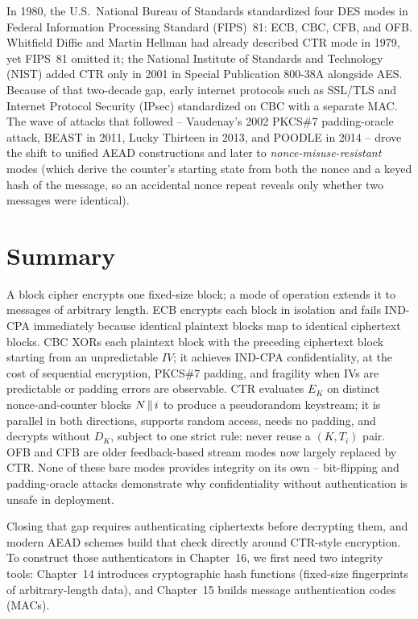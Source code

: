 \begin{historybox}
In 1980, the U.S.\ National Bureau of Standards standardized four DES modes in Federal Information Processing Standard (FIPS)~81: ECB, CBC, CFB, and OFB. Whitfield Diffie and Martin Hellman had already described CTR mode in 1979, yet FIPS~81 omitted it; the National Institute of Standards and Technology (NIST) added CTR only in 2001 in Special Publication 800-38A alongside AES. Because of that two-decade gap, early internet protocols such as SSL/TLS and Internet Protocol Security (IPsec) standardized on CBC with a separate MAC. The wave of attacks that followed -- Vaudenay's 2002 PKCS\#7 padding-oracle attack, BEAST in 2011, Lucky Thirteen in 2013, and POODLE in 2014 -- drove the shift to unified AEAD constructions and later to \emph{nonce-misuse-resistant} modes (which derive the counter's starting state from both the nonce and a keyed hash of the message, so an accidental nonce repeat reveals only whether two messages were identical).
\end{historybox}

\section{Summary}

A block cipher encrypts one fixed-size block; a mode of operation extends it to messages of arbitrary length. ECB encrypts each block in isolation and fails IND-CPA immediately because identical plaintext blocks map to identical ciphertext blocks. CBC XORs each plaintext block with the preceding ciphertext block starting from an unpredictable $\mathit{IV}$; it achieves IND-CPA confidentiality, at the cost of sequential encryption, PKCS\#7 padding, and fragility when IVs are predictable or padding errors are observable. CTR evaluates $E_K$ on distinct nonce-and-counter blocks $N \,\|\, i$ to produce a pseudorandom keystream; it is parallel in both directions, supports random access, needs no padding, and decrypts without $D_K$, subject to one strict rule: never reuse a $(K, T_i)$ pair. OFB and CFB are older feedback-based stream modes now largely replaced by CTR. None of these bare modes provides integrity on its own -- bit-flipping and padding-oracle attacks demonstrate why confidentiality without authentication is unsafe in deployment.

Closing that gap requires authenticating ciphertexts before decrypting them, and modern AEAD schemes build that check directly around CTR-style encryption. To construct those authenticators in Chapter~16, we first need two integrity tools: Chapter~14 introduces cryptographic hash functions (fixed-size fingerprints of arbitrary-length data), and Chapter~15 builds message authentication codes (MACs).

